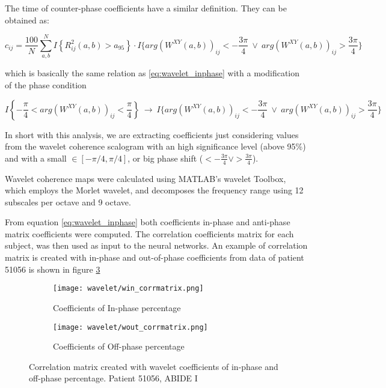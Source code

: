 \documentclass[11pt]{report}
\begin{document}
The time of counter-phase coefficients have a similar definition. They can be obtained as:

\begin{equation} \label{eq:wavelet_counterphase}
c_{ij} = \frac{100}{N}\sum_{a, b}^N I\left\{ R_{ij}^2(a,b) > a_{95}\right\} \cdot I\{arg(W^{XY}(a, b))_{ij} < -\frac{3\pi}{4} \ \lor \ arg (W^{XY}(a, b))_{ij} >\frac{3\pi}{4} \}
\end{equation}

which is basically the same relation as \ref{eq:wavelet_inphase} with a modification of the phase condition

\[
I\left\{-\frac{\pi}{4}<arg(W^{XY}(a, b))_{ij} < \frac{\pi}{4}  \right\} \ \longrightarrow \ I\{arg(W^{XY}(a, b))_{ij} < -\frac{3\pi}{4} \ \lor \ arg (W^{XY}(a, b))_{ij} >\frac{3\pi}{4} \}
\]

\hfill

\noindent In short with this analysis, we are extracting coefficients just considering values from the wavelet coherence scalogram with an high significance level (above 95\%) and with a small $\in [-\pi/4, \pi/4]$, or big phase shift ($< -\frac{3\pi}{4}  \lor  >\frac{3 \pi}{4}$).

Wavelet coherence maps were calculated using MATLAB's wavelet Toolbox, which employs the Morlet wavelet, and decomposes the frequency range using 12 subscales per octave and 9 octave.


From equation \ref{eq:wavelet_inphase} both coefficients in-phase and anti-phase matrix coefficients were computed.
The correlation coefficients matrix for each subject, was then used as input to the neural networks.
An example of correlation matrix is created with in-phase and out-of-phase coefficients from data of patient 51056 is shown in figure \ref{fig:win_wout}



\begin{figure}
\centering
\begin{subfigure}{0.45\textwidth}
\texttt{[image: wavelet/win\_corrmatrix.png]}
\caption{Coefficients of In-phase percentage}
\label{}
\end{subfigure}
\begin{subfigure}{0.45\textwidth}
\texttt{[image: wavelet/wout\_corrmatrix.png]}
\caption{Coefficients of Off-phase percentage}
\label{}
\end{subfigure}
\caption{Correlation matrix created with wavelet coefficients of in-phase and off-phase percentage. Patient 51056, ABIDE I }
\label{fig:win_wout}
\end{figure}
\end{document}
